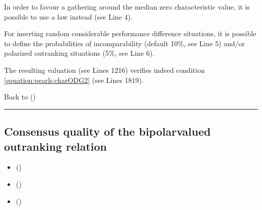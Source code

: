 \documentclass[a4paper,12pt,english]{sphinxhowto}
\begin{document}
\sphinxAtStartPar
In order to favour a gathering around the median zero characteristic value, it is possible to use a  law instead (see Line 4).

\sphinxAtStartPar
For inserting random considerable performance difference situations, it is possible to define the probabilities of incomparability (default 10\%, see Line 5) and/or polarized outranking situations (5\%, see Line 6).

\sphinxAtStartPar
The resulting valuation (see Lines 12\sphinxhyphen{}16) verifies indeed condition \eqref{equation:pearls:charODG2} (see Lines 18\sphinxhyphen{}19).

\sphinxAtStartPar
Back to {\hyperref[\detokenize{pearls:pearls-label}]{}} ()


\bigskip\hrule\bigskip



\subsection{Consensus quality of the bipolar\sphinxhyphen{}valued outranking relation}
\label{\detokenize{pearls:consensus-quality-of-the-bipolar-valued-outranking-relation}}\label{\detokenize{pearls:outranking-consensus-tutorial-label}}
\begin{sphinxcontents}
\begin{itemize}
\item {} 
\sphinxAtStartPar
{}\label{\detokenize{pearls:id169}}{\hyperref[\detokenize{pearls:circular-performance-tableaux}]{}} ()

\item {} 
\sphinxAtStartPar
{}\label{\detokenize{pearls:id170}}{\hyperref[\detokenize{pearls:a-difficult-decision-problem}]{}} ()

\item {} 
\sphinxAtStartPar
{}\label{\detokenize{pearls:id171}}{\hyperref[\detokenize{pearls:the-central-condorcet-point-of-view}]{}} ()

\end{itemize}
\end{sphinxcontents}
\end{document}
